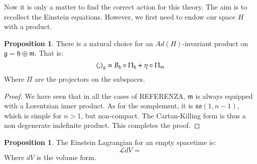 \documentclass[12pt,a4paper]{report}
\theoremstyle{definition}
\theoremstyle{Theorem}
\newtheorem{Prop}[Def]{Proposition}
\theoremstyle{break}
\theoremstyle{definition}
\begin{document}
	Now it is only a matter to find the correct action for this theory. The aim is to recollect the Einstein equations. However, we first need to endow our space $H$ with a product.
	\begin{Prop}
		There is a natural choice for an $Ad(H)$-invariant product on $\mathfrak{g}=\mathfrak{h}\oplus\mathfrak{m}$. That is:
		$$\braket{,}_\mathfrak{g}=B_\mathfrak{h}\circ\Pi_\mathfrak{h}+\eta\circ\Pi_\mathfrak{m}$$
		Where $\Pi$ are the projectors on the subspaces.
	\end{Prop}
	\begin{proof}
		We have seen that in all the cases of REFERENZA, $\mathfrak{m}$ is always equipped with a Lorentzian inner product. As for the somplement, it is $\mathfrak{so}(1,n-1)$, which is simple for $n>1$, but non-compact. The Cartan-Killing form is thus a non degenerate indefinite product. This completes the proof.
	\end{proof}
	\begin{Prop}
		The Einstein Lagrangian for an empty spacetime is:
		$$\mathcal{L}dV=$$
		Where $dV$ is the volume form.
	\end{Prop}
\end{document}
